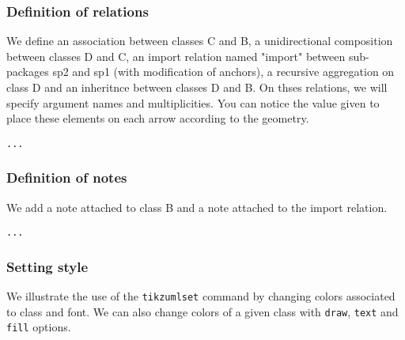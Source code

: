 \documentclass[a4paper,11pt]{report}
\newcommand{\inputTikZ}[1]{%
  }%
\newcommand{\inputTikZ}[1]{%
    \texttt{[image: fig/\#1.pdf]}%
  }%
\begin{document}
\begin{center}
\inputTikZ{classdiagstep2}
\end{center}


\subsubsection{Definition of relations}

We define an association between classes C and B, a unidirectional composition between classes D and C, an import relation named "import" between sub-packages sp2 and sp1 (with modification of anchors), a recursive aggregation on class D and an inheritnce between classes D and B. On thses relations, we will specify argument names and multiplicities. You can notice the value given to place 
these elements on each arrow according to the geometry.

\medskip

\hspace{-0.7cm}\lstinline{...}
{\color{red!70!black}

}

\begin{center}
\inputTikZ{classdiagstep3}
\end{center}

\subsubsection{Definition of notes}

We add a note attached to class B and a note attached to the import relation.

\medskip

\hspace{-0.7cm}\lstinline{...}
{\color{red!70!black}

}

\begin{center}
\inputTikZ{classdiagstep4}
\end{center}

\subsubsection{Setting style}

We illustrate the use of the {\tt tikzumlset} command by changing colors associated to class and font. 
We can also change colors of a given class with {\tt draw}, {\tt text} and {\tt fill} options.

\medskip
\end{document}
